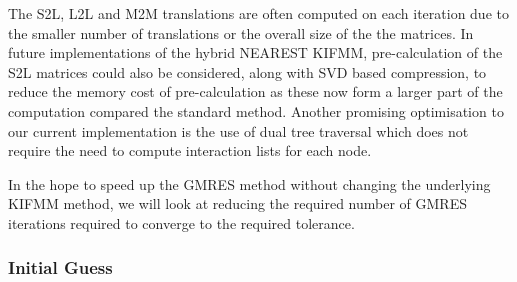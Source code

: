 The S2L, L2L and M2M translations are often computed on each iteration due to the smaller number of translations or the overall size of the the matrices. In future implementations of the hybrid NEAREST KIFMM, pre-calculation of the S2L matrices could also be considered, along with SVD based compression, to reduce the memory cost of pre-calculation \cite{Drineas2006FAST,Cao2012ABEM} as these now form a larger part of the computation compared the standard method. Another promising optimisation to our current implementation is the use of dual tree traversal \cite{Yokota2013AnArchitectures:,Dehnen2002AAlgorithm,Carrier2006ASimulations,Wilson2021ATraversal} which does not require the need to compute interaction lists for each node.

In the hope to speed up the GMRES method without changing the underlying KIFMM method, we will look at reducing the required number of GMRES iterations required to converge to the required tolerance.

\subsubsection{Initial Guess}\label{sec:Guess}

